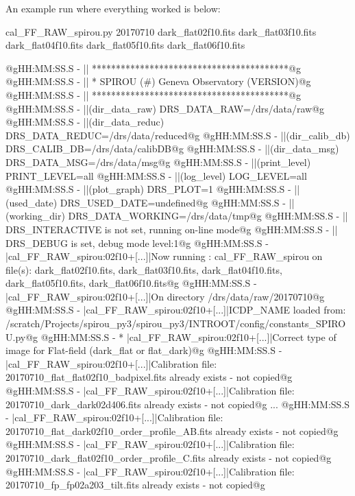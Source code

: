 An example run where everything worked is below:
\begin{cmdbox}[title={example}]
cal_FF_RAW_spirou.py 20170710 dark_flat02f10.fits dark_flat03f10.fits dark_flat04f10.fits dark_flat05f10.fits dark_flat06f10.fits
\end{cmdbox}
\begin{cmdboxprintspecial}[fontupper=\tiny, fontlower=\tiny]
@gHH:MM:SS.S -   || *****************************************@g
@gHH:MM:SS.S -   || * SPIROU \@(#) Geneva Observatory (VERSION)@g
@gHH:MM:SS.S -   || *****************************************@g
@gHH:MM:SS.S -   ||(dir_data_raw)      DRS_DATA_RAW=/drs/data/raw@g
@gHH:MM:SS.S -   ||(dir_data_reduc)    DRS_DATA_REDUC=/drs/data/reduced@g
@gHH:MM:SS.S -   ||(dir_calib_db)      DRS_CALIB_DB=/drs/data/calibDB@g
@gHH:MM:SS.S -   ||(dir_data_msg)      DRS_DATA_MSG=/drs/data/msg@g
@gHH:MM:SS.S -   ||(print_level)       PRINT_LEVEL=all         %
@gHH:MM:SS.S -   ||(log_level)         LOG_LEVEL=all         %
@gHH:MM:SS.S -   ||(plot_graph)        DRS_PLOT=1            %
@gHH:MM:SS.S -   ||(used_date)         DRS_USED_DATE=undefined@g
@gHH:MM:SS.S -   ||(working_dir)       DRS_DATA_WORKING=/drs/data/tmp@g
@gHH:MM:SS.S -   ||                    DRS_INTERACTIVE is not set, running on-line mode@g
@gHH:MM:SS.S -   ||                    DRS_DEBUG is set, debug mode level:1@g
@gHH:MM:SS.S -   |cal_FF_RAW_spirou:02f10+[...]|Now running : cal_FF_RAW_spirou on file(s): dark_flat02f10.fits, dark_flat03f10.fits, dark_flat04f10.fits, dark_flat05f10.fits, dark_flat06f10.fits@g
@gHH:MM:SS.S -   |cal_FF_RAW_spirou:02f10+[...]|On directory /drs/data/raw/20170710@g
@gHH:MM:SS.S -   |cal_FF_RAW_spirou:02f10+[...]|ICDP_NAME loaded from: /scratch/Projects/spirou_py3/spirou_py3/INTROOT/config/constants_SPIROU.py@g
@gHH:MM:SS.S - * |cal_FF_RAW_spirou:02f10+[...]|Correct type of image for Flat-field (dark_flat or flat_dark)@g
@gHH:MM:SS.S -   |cal_FF_RAW_spirou:02f10+[...]|Calibration file: 20170710_flat_flat02f10_badpixel.fits already exists - not copied@g
@gHH:MM:SS.S -   |cal_FF_RAW_spirou:02f10+[...]|Calibration file: 20170710_dark_dark02d406.fits already exists - not copied@g
...
@gHH:MM:SS.S -   |cal_FF_RAW_spirou:02f10+[...]|Calibration file: 20170710_flat_dark02f10_order_profile_AB.fits already exists - not copied@g
@gHH:MM:SS.S -   |cal_FF_RAW_spirou:02f10+[...]|Calibration file: 20170710_dark_flat02f10_order_profile_C.fits already exists - not copied@g
@gHH:MM:SS.S -   |cal_FF_RAW_spirou:02f10+[...]|Calibration file: 20170710_fp_fp02a203_tilt.fits already exists - not copied@g

\end{cmdboxprintspecial}
